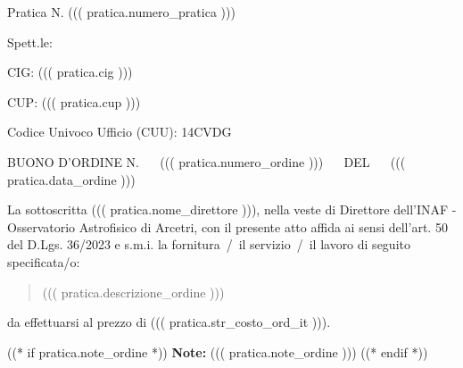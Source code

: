 \documentclass[a4paper,12pt]{letter}
\begin{document}
\topaddr

{\small Pratica N. ((( pratica.numero_pratica ))) }
\vspace{.4cm}

\begin{flushright}
\begin{minipage}{12cm}
Spett.le:\\
\end{minipage}
\end{flushright}
\vspace{5mm}

CIG: ((( pratica.cig ))) 

CUP: ((( pratica.cup )))

Codice Univoco Ufficio (CUU): 14CVDG

BUONO D'ORDINE N. ~~ ((( pratica.numero_ordine ))) ~~ DEL ~~ ((( pratica.data_ordine )))

La sottoscritta ((( pratica.nome_direttore ))), 
nella veste di Direttore dell'INAF - Osservatorio Astrofisico di Arcetri,
con il presente atto affida ai sensi dell'art. 50 del D.Lgs. 36/2023 e s.m.i.
la fornitura~/~il servizio~/~il lavoro di seguito specificata/o:

\begin{quote}
((( pratica.descrizione_ordine )))
\end{quote}

da effettuarsi al prezzo di ((( pratica.str_costo_ord_it ))).

((* if pratica.note_ordine *))
{\bf Note:} ((( pratica.note_ordine )))
((* endif *))
\vspace{1cm}
\end{document}
